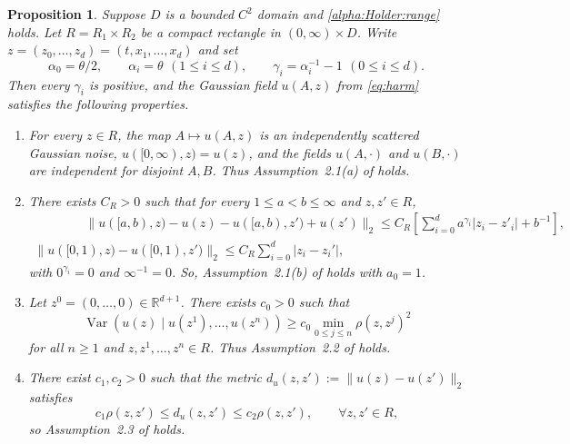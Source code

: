 \documentclass[reqno]{amsart}
\DeclareMathOperator{\Var}{Var}
\newcommand{\R}{\mathbb R}
\newcommand{\1}{\mathbf 1}
\numberwithin{equation}{section}
\newtheorem{proposition}[theorem]{Proposition}
\theoremstyle{definition}
\begin{document}
\begin{proposition}\label{prop:LX}
Suppose \(D\) is a bounded \(C^2\) domain and
\eqref{alpha:Holder:range} holds.
Let \(R=R_1 \times R_2\) be a
compact rectangle in $(0,\infty)\times D$. Write \(z=(z_0,\ldots,z_d)=(t,x_1,\ldots,x_d)\)
and set
\[
    \alpha_0=\theta/2,\qquad \alpha_i=\theta\ \, (1\le i\le d),
    \qquad
    \gamma_i=\alpha_i^{-1}-1\ \, (0\le i \le d).
\]
Then every \(\gamma_i\) is positive, and the Gaussian field \(u(A,z)\) from
\eqref{eq:harm} satisfies the following properties.

\begin{enumerate}
\item For every \(z\in R\), the map \(A\mapsto u(A,z)\) is an
independently scattered Gaussian noise,
\(u([0,\infty),z)=u(z)\), and the fields \(u(A,\cdot)\) and
\(u(B,\cdot)\) are independent for disjoint \(A,B\). 
Thus Assumption~2.1(a) of \cite{LX23} holds.\smallskip

\item There exists $C_R>0$ such that for every \(1\le a<b\le\infty\) and \(z,z'\in R\),
\begin{gather*}
\qquad\qquad \|u([a,b),z)-u(z)-u([a,b),z')+u(z')\|_2\le C_R\left[
   \sum_{i=0}^d a^{\gamma_i}|z_i-z'_i|+b^{-1}\right],\\
	\|u([0,1),z) - u([0,1),z')\|_2 \le C_R \sum_{i=0}^d |z_i-z_i'|,
\end{gather*}
with \(0^{\gamma_i}=0\) and \(\infty^{-1}=0\). So, Assumption~2.1(b) of \cite{LX23} holds with \(a_0=1\).\smallskip

\item Let \(z^0=(0,\dots, 0)\in\R^{d+1}\). There exists \(c_0>0\) such that
\[
    \Var\left(u(z)\mid u(z^1),\ldots,u(z^n)\right)
    \ge
    c_0\min_{0\le j\le n}\rho(z,z^j)^2
\]
for all \(n\ge1\) and \(z,z^1,\ldots,z^n\in R\). Thus
Assumption~2.2 of \cite{LX23} holds.\smallskip

\item There exist $c_1,c_2>0$ such that the metric $d_u(z,z') := \|u(z)-u(z')\|_2$ satisfies
\[
    c_1\rho(z,z')\le d_u(z,z')\le c_2\rho(z,z'),
    \qquad \forall z,z'\in R,
\]
so Assumption~2.3 of \cite{LX23} holds.
\end{enumerate}
%
\end{proposition}
\end{document}
